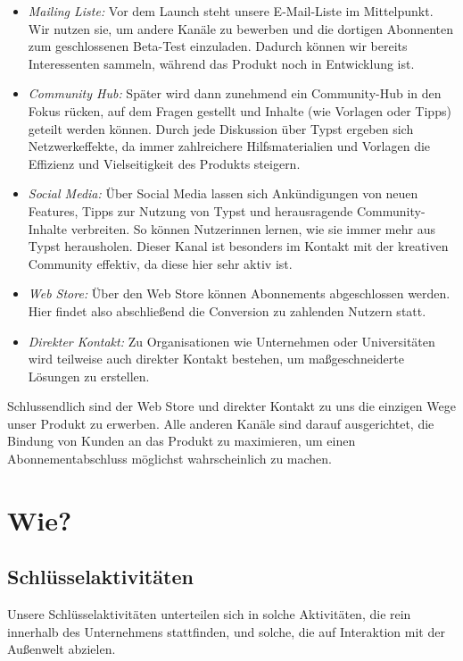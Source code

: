\documentclass[11pt, a4paper]{article}
\newcommand{\gender}{\raisebox{-.25em}{*}}
\let\oldsection\section
\renewcommand\section{\clearpage\oldsection}
\begin{document}
\begin{itemize}
    \item \emph{Mailing Liste:}  Vor dem Launch steht unsere E-Mail-Liste im Mittelpunkt. Wir nutzen sie, um andere Kanäle zu bewerben und die dortigen Abonnenten zum geschlossenen Beta-Test einzuladen. Dadurch können wir bereits Interessenten sammeln, während das Produkt noch in Entwicklung ist.
    \item \emph{Community Hub:} Später wird dann zunehmend ein Community-Hub in den Fokus rücken, auf dem Fragen gestellt und Inhalte (wie Vorlagen oder Tipps) geteilt werden können. Durch jede Diskussion über Typst ergeben sich Netzwerkeffekte, da immer zahlreichere Hilfsmaterialien und Vorlagen die Effizienz und Vielseitigkeit des Produkts steigern.
    \item \emph{Social Media:} Über Social Media lassen sich Ankündigungen von neuen Features, Tipps zur Nutzung von Typst und herausragende Community-Inhalte verbreiten. So können Nutzer\gender{}innen lernen, wie sie immer mehr aus Typst herausholen. Dieser Kanal ist besonders im Kontakt mit der kreativen Community effektiv, da diese hier sehr aktiv ist.
    \item \emph{Web Store:} Über den Web Store können Abonnements abgeschlossen werden. Hier findet also abschließend die Conversion zu zahlenden Nutzern statt.
    \item \emph{Direkter Kontakt:} Zu Organisationen wie Unternehmen oder Universitäten wird teilweise auch direkter Kontakt bestehen, um maßgeschneiderte Lösungen zu erstellen.
\end{itemize}


Schlussendlich sind der Web Store und direkter Kontakt zu uns die einzigen Wege unser Produkt zu erwerben. Alle anderen Kanäle sind darauf ausgerichtet, die Bindung von Kunden an das Produkt zu maximieren, um einen Abonnementabschluss möglichst wahrscheinlich zu machen.

\section*{Wie?}
\subsection*{Schlüsselaktivitäten}

Unsere Schlüsselaktivitäten unterteilen sich in solche Aktivitäten, die rein innerhalb des Unternehmens stattfinden, und solche, die auf Interaktion mit der Außenwelt abzielen.
\end{document}
